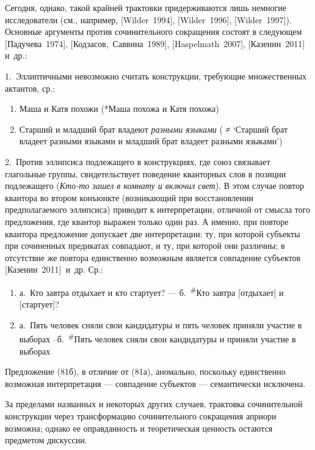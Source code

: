 Сегодня, однако, такой крайней трактовки придерживаются лишь немногие
исследователи (см., например, {[}Wilder~1994{]}, {[}Wilder~1996{]},
{[}Wilder~1997{]}). Основные аргументы против сочинительного сокращения
состоят в следующем {[}Падучева~1974{]}, {[}Кодзасов,~Саввина~1989{]},
{[}Haspelmath~2007{]}, {[}Казенин~2011{]} и~др.:

1.~Эллиптичными невозможно считать конструкции, требующие множественных
актантов, ср.:

\begin{enumerate}
  \def\labelenumi{(\arabic{enumi})}
  \setcounter{enumi}{78}
  \item
        Маша и Катя похожи (*Маша похожа и Катя похожа)
  \item
        Старший и младший брат владеют \textit{разными языками} ( ≠ `Старший
        брат владеет разными языками и младший брат владеет разными языками')
\end{enumerate}

2.~Против эллипсиса подлежащего в конструкциях, где союз связывает
глагольные группы, свидетельствует поведение кванторных слов в позиции
подлежащего (\textit{Кто-то зашел в комнату и включил свет}). В этом
случае повтор квантора во втором конъюнкте (возникающий при
восстановлении предполагаемого эллипсиса) приводит к интерпретации,
отличной от смысла того предложения, где квантор выражен только один
раз. А именно, при повторе квантора предложение допускает две
интерпретации: ту, при которой субъекты при сочиненных предикатах
совпадают, и ту, при которой они различны; в отсутствие же повтора
единственно возможным является совпадение субъектов
{[}Казенин~2011{]}~и~др. Ср.:

\begin{enumerate}
  \def\labelenumi{(\arabic{enumi})}
  \setcounter{enumi}{80}
  \item
        а.~Кто завтра отдыхает и кто стартует? --- б.~\textsuperscript{\#}Кто
        завтра {[}отдыхает{]} и {[}стартует{]}?
  \item
        а.~Пять человек сняли свои кандидатуры и пять человек приняли участие
        в выборах --б.~\textsuperscript{\#}Пять человек сняли свои кандидатуры
        и приняли участие в выборах
\end{enumerate}

Предложение (81б), в отличие от (81а), аномально, поскольку единственно
возможная интерпретация --- совпадение субъектов --- семантически
исключена.

За пределами названных и некоторых других случаев, трактовка
сочинительной конструкции через трансформацию сочинительного сокращения
априори возможна; однако ее оправданность и теоретическая ценность
остаются предметом дискуссии.

